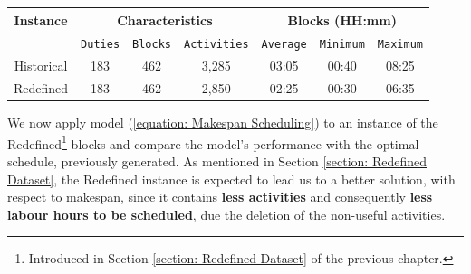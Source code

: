 
\begin{table}[h]
\small
    \centering 
    \begin{tabular}{|c|c|c|c|c|c|c|}
        \hline
        \textbf{Instance} & \multicolumn{3}{|c|}{ \textbf{Characteristics}} & \multicolumn{3}{|c|}{ \textbf{Blocks (HH:mm)}}  \\
        \hline
        & \texttt{Duties} & \texttt{Blocks} & \texttt{Activities} & \texttt{Average} &  \texttt{Minimum} & \texttt{Maximum} \\
        \hline
        Historical & 183 & 462 & 3,285 & 03:05 & 00:40 & 08:25 \\
        \hline
        Redefined & 183 & 462 & 2,850 & 02:25 & 00:30 & 06:35 \\
        \hline
    \end{tabular}%
    \medbreak
\end{table}

\vspace{\baselineskip}
\noindent
We now apply model (\ref{equation: Makespan Scheduling}) to an instance of the Redefined\footnote{Introduced in Section \ref{section: Redefined Dataset} of the previous chapter.} blocks and compare the model's performance with the optimal schedule, previously generated. As mentioned in Section \ref{section: Redefined Dataset}, the Redefined instance is expected to lead us to a better solution, with respect to makespan, since it contains \textbf{less activities} and consequently \textbf{less labour hours to be scheduled}, due the deletion of the non-useful activities. 


